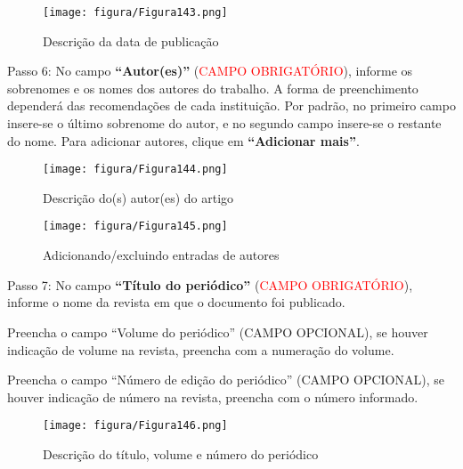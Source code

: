 \documentclass[12pt,hidelinks]{article}
\begin{document}
    \begin{figure}[!htp]
                \centering
                \texttt{[image: figura/Figura143.png]}
                \caption{Descrição da data de publicação}
            \label{Rotulo}
        \end{figure}

\newpage

    Passo 6: No campo \textbf{“Autor(es)”} (\textcolor{red}{CAMPO OBRIGATÓRIO}), informe os sobrenomes e os nomes dos autores do trabalho. A forma de preenchimento dependerá das recomendações de cada instituição. Por padrão, no primeiro campo insere-se o último sobrenome do autor, e no segundo campo insere-se o restante do nome. Para adicionar autores, clique em \textbf{“Adicionar mais”}.
    
    \begin{figure}[!htp]
                \centering
                \texttt{[image: figura/Figura144.png]}
                \caption{Descrição do(s) autor(es) do artigo}
            \label{Rotulo}
        \end{figure}
    
    \begin{figure}[!htp]
                \centering
                \texttt{[image: figura/Figura145.png]}
                \caption{Adicionando/excluindo entradas de autores}
            \label{Rotulo}
        \end{figure}
    
    Passo 7: No campo \textbf{“Título do periódico”} (\textcolor{red}{CAMPO OBRIGATÓRIO}), informe o nome da revista em que o documento foi publicado.
    
    \singlespacing
    
    Preencha o campo “Volume do periódico” (\textcolor{applegreen}{CAMPO OPCIONAL}), se houver indicação de volume na revista, preencha com a numeração do volume.
    
    \singlespacing
    
    Preencha o campo “Número de edição do periódico” (\textcolor{applegreen}{CAMPO OPCIONAL}), se houver indicação de número na revista, preencha com o número informado.

\newpage
    
    \begin{figure}[!htp]
                \centering
                \texttt{[image: figura/Figura146.png]}
                \caption{Descrição do título, volume e número do periódico}
            \label{Rotulo}
        \end{figure}
    
\end{document}
